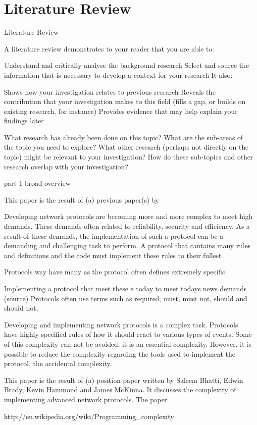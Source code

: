 \section{Literature Review}
Literature Review

A literature review demonstrates to your reader that you are able to:

Understand and critically analyse the background research
Select and source the information that is necessary to develop a context for your research
It also:

Shows how your investigation relates to previous research
Reveals the contribution that your investigation makes to this field (fills a gap, or builds on existing research, for instance)
Provides evidence that may help explain your findings later

What research has already been done on this topic?
What are the sub-areas of the topic you need to explore?
What other research (perhaps not directly on the topic) might be relevant to your investigation?
How do these sub-topics and other research overlap with your investigation?

part 1 broad overview

This paper is the result of (a) previous paper(s) by

Developing network protocols are becoming more and more complex to meet high demands. These demands often related to reliability, security and efficiency. As a result of these demands, the implementation of such a protocol can be a demanding and challenging task to perform. A protocol that cantains many rules and definitions and the code must implement these rules to their fullest

Protocols way have many  as the protocol often defines extremely specific


Implementing a protocol that meet these e
today to meet todays news demands (source)
Protocols often use terms such as required, must, must not, should and should not, 


Developing and implementing network protocols is a complex task. Protocols have highly specified rules of how it should react to various types of events. Some of this complexity can not be avoided, it is an essential complexity. However, it is possible to reduce the complexity regarding the tools used to implement the protocol, the accidental complexity.

This paper is the result of (a) position paper written by Saleem Bhatti, Edwin Brady, Kevin Hammond and James McKinna. It discusses the complexity of implementing advanced network protocols. The paper 


http://en.wikipedia.org/wiki/Programming_complexity
